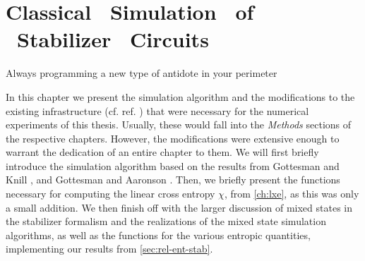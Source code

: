 \chapter{Classical \ Simulation \ of \ Stabilizer \ Circuits}
\label{ch:mixed}
\epigraph{Always programming a new type of antidote in your perimeter}{
\citeauthor{quasimotoDiscipline99Pt2000}
}

In this chapter we present the simulation algorithm and 
the modifications to the existing infrastructure (cf. ref.
\cite{langCliffordCircuitSimulator2022}) that
were necessary for the numerical experiments of this thesis. Usually, these
would fall into the \emph{Methods} sections of the respective
chapters. However, the modifications were extensive enough to warrant the
dedication of an entire chapter to them. We will first briefly introduce the
simulation algorithm based on the results from Gottesman and Knill
\cite{gottesmanHeisenbergRepresentationQuantum1998}, and Gottesman and Aaronson
\cite{aaronsonImprovedSimulationStabilizer2004}. Then, we briefly present
the functions
necessary for computing the linear cross entropy $\chi$, from \cref{ch:lxe}, as
this was only a small addition. We
then finish off with the larger discussion of mixed states in the stabilizer
formalism and the realizations of the mixed state simulation algorithms, as
well as the functions for the various entropic quantities, implementing our
results from \cref{sec:rel-ent-stab}.

%
%
%
%
%
\clearpage
